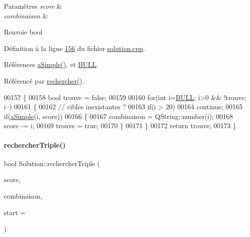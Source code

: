 \begin{DoxyParams}{Paramètres}
{\em score} & \\
\hline
{\em combinaison} & \\
\hline
\end{DoxyParams}
\begin{DoxyReturn}{Renvoie}
bool 
\end{DoxyReturn}


Définition à la ligne \hyperlink{solution_8cpp_source_l00156}{156} du fichier \hyperlink{solution_8cpp_source}{solution.\+cpp}.



Références \hyperlink{solution_8cpp_source_l00141}{a\+Simple()}, et \hyperlink{darts_8h_source_l00022}{B\+U\+LL}.



Référencé par \hyperlink{solution_8cpp_source_l00217}{rechercher()}.


\begin{DoxyCode}
00157 \{
00158     \textcolor{keywordtype}{bool} trouve = \textcolor{keyword}{false};
00159 
00160     \textcolor{keywordflow}{for}(\textcolor{keywordtype}{int} i=\hyperlink{darts_8h_ac26e54839269cea6c170f2699af4ead2}{BULL}; i>0 && !trouve; i--)
00161     \{
00162         \textcolor{comment}{// cibles inexistantes ?}
00163         \textcolor{keywordflow}{if}(i > 20)
00164             \textcolor{keywordflow}{continue};
00165         \textcolor{keywordflow}{if}(\hyperlink{class_solution_a932ab2aea629d049202e8f8e38cc01b3}{aSimple}(i, score))
00166         \{
00167             combinaison = QString::number(i);
00168             score -= i;
00169             trouve = \textcolor{keyword}{true};
00170         \}
00171     \}
00172     \textcolor{keywordflow}{return} trouve;
00173 \}
\end{DoxyCode}
\mbox{\label{class_solution_a7f3302e8292858a51795f08751d54ef9}} 
\paragraph{\texorpdfstring{rechercher\+Triple()}{rechercherTriple()}}
{\footnotesize\ttfamily bool Solution\+::rechercher\+Triple (\begin{DoxyParamCaption}\item[{int \&}]{score,  }\item[{Q\+String \&}]{combinaison,  }\item[{int}]{start = {} }\end{DoxyParamCaption})\hspace{0.3cm}{\ttfamily [private]}}



